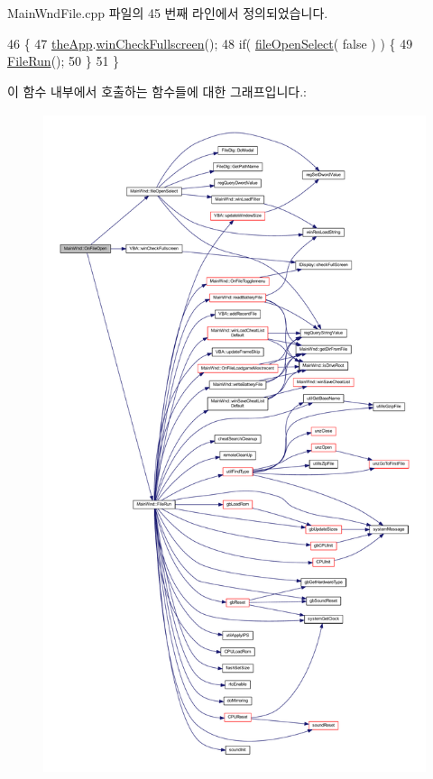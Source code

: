 Main\+Wnd\+File.\+cpp 파일의 45 번째 라인에서 정의되었습니다.


\begin{DoxyCode}
46 \{
47     \mbox{\hyperlink{_v_b_a_8cpp_a8095a9d06b37a7efe3723f3218ad8fb3}{theApp}}.\mbox{\hyperlink{class_v_b_a_a340eaeeb7fcfc242f08ac3442d991a96}{winCheckFullscreen}}();
48     \textcolor{keywordflow}{if}( \mbox{\hyperlink{class_main_wnd_a872b497a88ca77012694cc909c62e6e4}{fileOpenSelect}}( \textcolor{keyword}{false} ) ) \{
49         \mbox{\hyperlink{class_main_wnd_a946cd4793215a424eb736af418ccbc3d}{FileRun}}();
50     \}
51 \}
\end{DoxyCode}
이 함수 내부에서 호출하는 함수들에 대한 그래프입니다.\+:
\nopagebreak
\begin{figure}[H]
\begin{center}
\leavevmode
\includegraphics[height=550pt]{class_main_wnd_ad60908c1c8c44204ea3c87c1109fa468_cgraph}
\end{center}
\end{figure}
\mbox{\label{class_main_wnd_ad1cfc9f500a8049610e1b7bc4c5ce725}} 
